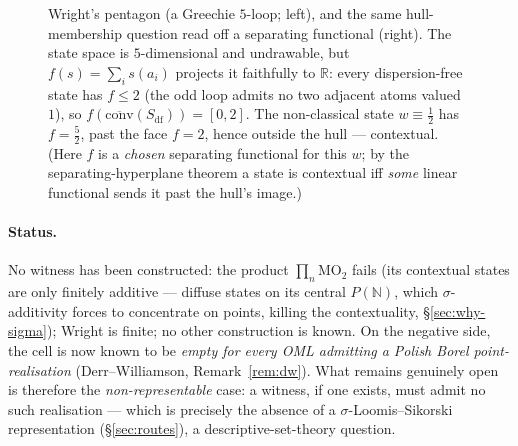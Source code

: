 \documentclass[11pt,reqno]{amsart}
\theoremstyle{plain}
\theoremstyle{definition}
\theoremstyle{remark}
\begin{document}
\begin{figure}[ht]
\caption{Wright's pentagon (a Greechie $5$-loop; left), and the same hull-membership
question read off a separating functional (right). The state space is $5$-dimensional
and undrawable, but $f(s)=\sum_i s(a_i)$ projects it faithfully to $\mathbb R$: every
dispersion-free state has $f\le2$ (the odd loop admits no two adjacent atoms valued
$1$), so $f(\overline{\mathrm{conv}}(S_{\mathrm{df}}))=[0,2]$. The non-classical state
$w\equiv\tfrac12$ has $f=\tfrac52$, past the face $f=2$, hence outside the hull ---
contextual. (Here $f$ is a \emph{chosen} separating functional for this $w$; by the
separating-hyperplane theorem a state is contextual iff \emph{some} linear functional
sends it past the hull's image.)}
\label{fig:pentagonhull}
\end{figure}

\paragraph{Status.} No witness has been constructed: the product
$\prod_n\mathrm{MO}_2$ fails (its contextual states are only finitely additive ---
diffuse states on its central $P(\mathbb N)$, which $\sigma$-additivity forces to
concentrate on points, killing the contextuality, \S\ref{sec:why-sigma}); Wright is
finite; no other construction is known. On the negative side, the cell is now known
to be \emph{empty for every OML admitting a Polish Borel point-realisation}
(Derr--Williamson, Remark~\ref{rem:dw}). What remains genuinely open is therefore the
\emph{non-representable} case: a witness, if one exists, must admit no such
realisation --- which is precisely the absence of a $\sigma$-Loomis--Sikorski
representation (\S\ref{sec:routes}), a descriptive-set-theory question.
\end{document}

